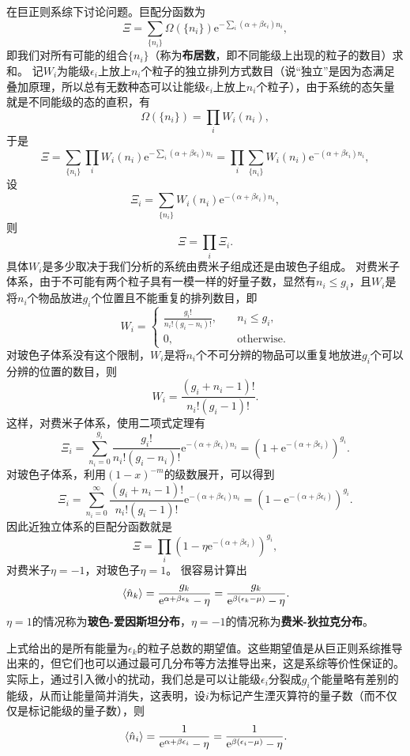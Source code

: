 \documentclass[hyperref, UTF8, a4paper]{ctexart}
\newcommand*{\ee}{\mathrm{e}}
\begin{document}
在巨正则系综下讨论问题。巨配分函数为
\[
    \Xi = \sum_{\{n_i\}} \Omega(\{n_i\}) \ee^{- \sum_i (\alpha + \beta \epsilon_i) n_i},
\]
即我们对所有可能的组合$\{n_i\}$（称为\textbf{布居数}，即不同能级上出现的粒子的数目）求和。
记$W_i$为能级$\epsilon_i$上放上$n_i$个粒子的独立排列方式数目（说“独立”是因为态满足叠加原理，所以总有无数种态可以让能级$\epsilon_i$上放上$n_i$个粒子），由于系统的态矢量就是不同能级的态的直积，有
\[
    \Omega(\{n_i\}) = \prod_i W_i(n_i),
\]
于是
\[
    \Xi = \sum_{\{n_i\}} \prod_i W_i(n_i) \ee^{- \sum_i (\alpha + \beta \epsilon_i) n_i} = \prod_i \sum_{\{n_i\}} W_i(n_i) \ee^{-  (\alpha + \beta \epsilon_i) n_i},
\]
设
\[
    \Xi_i = \sum_{\{n_i\}} W_i(n_i) \ee^{-  (\alpha + \beta \epsilon_i) n_i},
\]
则
\[
    \Xi = \prod_i \Xi_i.
\]
具体$W_i$是多少取决于我们分析的系统由费米子组成还是由玻色子组成。
对费米子体系，由于不可能有两个粒子具有一模一样的好量子数，显然有$n_i \leq g_i$，且$W_i$是将$n_i$个物品放进$g_i$个位置且不能重复的排列数目，即
\[
    W_i = \begin{cases}
        \frac{g_i !}{n_i ! (g_i - n_i) !}, &\quad n_i \leq g_i, \\
        0, &\quad \text{otherwise}.
    \end{cases}
\]
对玻色子体系没有这个限制，$W_i$是将$n_i$个不可分辨的物品可以重复地放进$g_i$个可以分辨的位置的数目，则
\[
    W_i = \frac{(g_i + n_i - 1) !}{n_i ! (g_i - 1)!}.
\]
这样，对费米子体系，使用二项式定理有
\[
    \Xi_i = \sum_{n_i=0}^{g_i} \frac{g_i !}{n_i ! (g_i - n_i) !} \ee^{- (\alpha + \beta \epsilon_i) n_i} = \left( 1 + \ee^{- (\alpha + \beta \epsilon_i) } \right)^{g_i}.
\]
对玻色子体系，利用$(1-x)^{-m}$的级数展开，可以得到
\[
    \Xi_i = \sum_{n_i=0}^\infty \frac{(g_i + n_i - 1) !}{n_i ! (g_i - 1)!} \ee^{- (\alpha + \beta \epsilon_i) n_i} = (1 - \ee^{- (\alpha + \beta \epsilon_i)})^{g_i}.
\]
因此近独立体系的巨配分函数就是
\begin{equation}
    \Xi = \prod_i (1 - \eta \ee^{- (\alpha + \beta \epsilon_i)})^{g_i},
\end{equation}
对费米子$\eta=-1$，对玻色子$\eta=1$。
很容易计算出
\begin{equation}
    \expval*{\hat{n}_k} = \frac{g_k}{\ee^{\alpha + \beta \epsilon_k} - \eta} = \frac{g_k}{\ee^{\beta (\epsilon_k - \mu)} - \eta}.
\end{equation}
$\eta=1$的情况称为\textbf{玻色-爱因斯坦分布}，$\eta=-1$的情况称为\textbf{费米-狄拉克分布}。

上式给出的是所有能量为$\epsilon_k$的粒子总数的期望值。这些期望值是从巨正则系综推导出来的，但它们也可以通过最可几分布等方法推导出来，这是系综等价性保证的。
实际上，通过引入微小的扰动，我们总是可以让能级$\epsilon_i$分裂成$g_i$个能量略有差别的能级，从而让能量简并消失，这表明，设$i$为标记产生湮灭算符的量子数（而不仅仅是标记能级的量子数），则
\begin{equation}
    \expval*{\hat{n}_i} = \frac{1}{\ee^{ \alpha + \beta \epsilon_i} - \eta } = \frac{1}{\ee^{\beta (\epsilon_i - \mu)} - \eta }.
\end{equation}
\end{document}

